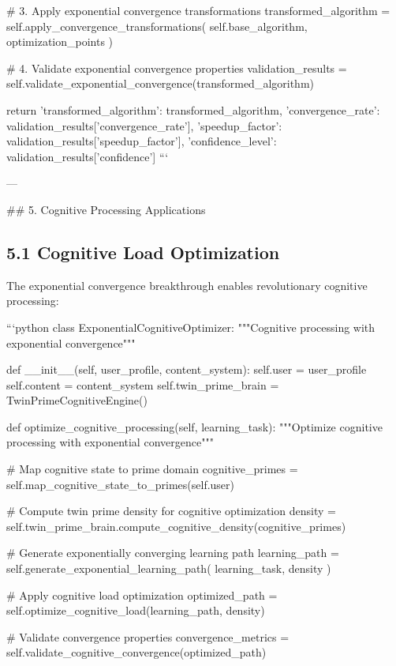 \documentclass[12pt,a4paper]{article}
\begin{document}
        # 3. Apply exponential convergence transformations
        transformed_algorithm = self.apply_convergence_transformations(
            self.base_algorithm, optimization_points
        )
        
        # 4. Validate exponential convergence properties
        validation_results = self.validate_exponential_convergence(transformed_algorithm)
        
        return {
            'transformed_algorithm': transformed_algorithm,
            'convergence_rate': validation_results['convergence_rate'],
            'speedup_factor': validation_results['speedup_factor'],
            'confidence_level': validation_results['confidence']
        }
```

---

## 5. Cognitive Processing Applications

\subsection{5.1 Cognitive Load Optimization}

The exponential convergence breakthrough enables revolutionary cognitive processing:

```python
class ExponentialCognitiveOptimizer:
    """Cognitive processing with exponential convergence"""
    
    def __init__(self, user_profile, content_system):
        self.user = user_profile
        self.content = content_system
        self.twin_prime_brain = TwinPrimeCognitiveEngine()
        
    def optimize_cognitive_processing(self, learning_task):
        """Optimize cognitive processing with exponential convergence"""
        
        # Map cognitive state to prime domain
        cognitive_primes = self.map_cognitive_state_to_primes(self.user)
        
        # Compute twin prime density for cognitive optimization
        density = self.twin_prime_brain.compute_cognitive_density(cognitive_primes)
        
        # Generate exponentially converging learning path
        learning_path = self.generate_exponential_learning_path(
            learning_task, density
        )
        
        # Apply cognitive load optimization
        optimized_path = self.optimize_cognitive_load(learning_path, density)
        
        # Validate convergence properties
        convergence_metrics = self.validate_cognitive_convergence(optimized_path)
        
\end{document}
